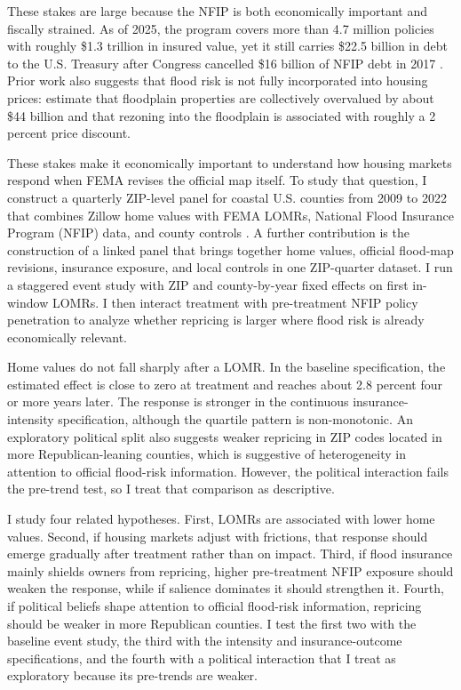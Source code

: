 \documentclass[12pt]{article}
\begin{document}
These stakes are large because the NFIP is both economically important and fiscally strained. As of 2025, the program covers more than 4.7 million policies with roughly \$1.3 trillion in insured value, yet it still carries \$22.5 billion in debt to the U.S. Treasury after Congress cancelled \$16 billion of NFIP debt in 2017 \citep{CRS2025_NFIPIntro,CRS2025_NFIPBorrowing}. Prior work also suggests that flood risk is not fully incorporated into housing prices: \citet{HinoBurke2021} estimate that floodplain properties are collectively overvalued by about \$44 billion and that rezoning into the floodplain is associated with roughly a 2 percent price discount.

These stakes make it economically important to understand how housing markets respond when FEMA revises the official map itself. To study that question, I construct a quarterly ZIP-level panel for coastal U.S. counties from 2009 to 2022 that combines Zillow home values with FEMA LOMRs, National Flood Insurance Program (NFIP) data, and county controls \citep{Zillow_ZHVI,FEMA_LOMR,FEMA_NFIP}. A further contribution is the construction of a linked panel that brings together home values, official flood-map revisions, insurance exposure, and local controls in one ZIP-quarter dataset. I run a staggered event study with ZIP and county-by-year fixed effects on first in-window LOMRs. I then interact treatment with pre-treatment NFIP policy penetration to analyze whether repricing is larger where flood risk is already economically relevant.

Home values do not fall sharply after a LOMR. In the baseline specification, the estimated effect is close to zero at treatment and reaches about 2.8 percent four or more years later. The response is stronger in the continuous insurance-intensity specification, although the quartile pattern is non-monotonic. An exploratory political split also suggests weaker repricing in ZIP codes located in more Republican-leaning counties, which is suggestive of heterogeneity in attention to official flood-risk information. However, the political interaction fails the pre-trend test, so I treat that comparison as descriptive.

I study four related hypotheses. First, LOMRs are associated with lower home values. Second, if housing markets adjust with frictions, that response should emerge gradually after treatment rather than on impact. Third, if flood insurance mainly shields owners from repricing, higher pre-treatment NFIP exposure should weaken the response, while if salience dominates it should strengthen it. Fourth, if political beliefs shape attention to official flood-risk information, repricing should be weaker in more Republican counties. I test the first two with the baseline event study, the third with the intensity and insurance-outcome specifications, and the fourth with a political interaction that I treat as exploratory because its pre-trends are weaker.
\end{document}
